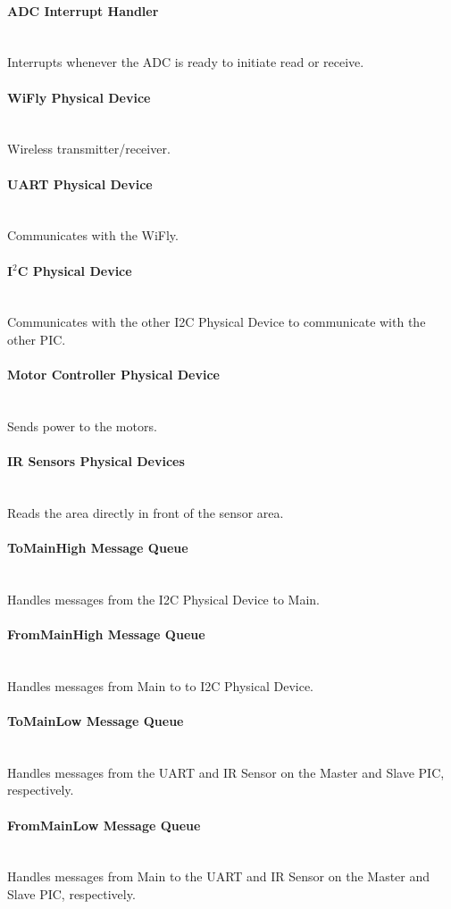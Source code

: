 \paragraph*{ADC Interrupt Handler}\mbox{}\\
Interrupts whenever the ADC is ready to initiate read or receive.

\paragraph*{WiFly Physical Device}\mbox{}\\
Wireless transmitter/receiver.

\paragraph*{UART Physical Device}\mbox{}\\
Communicates with the WiFly. 

\paragraph*{I$^2$C Physical Device}\mbox{}\\
Communicates with the other I2C Physical Device to communicate with the other PIC. 

\paragraph*{Motor Controller Physical Device}\mbox{}\\
Sends power to the motors. 

\paragraph*{IR Sensors Physical Devices}\mbox{}\\
Reads the area directly in front of the sensor area.

\paragraph*{ToMainHigh Message Queue}\mbox{}\\
Handles messages from the I2C Physical Device to Main. 

\paragraph*{FromMainHigh Message Queue}\mbox{}\\
Handles messages from Main to to I2C Physical Device. 

\paragraph*{ToMainLow Message Queue}\mbox{}\\
Handles messages from the UART and IR Sensor on the Master and Slave PIC, respectively.

\paragraph*{FromMainLow Message Queue}\mbox{}\\
Handles messages from Main to the UART and IR Sensor on the Master and Slave PIC, respectively.


